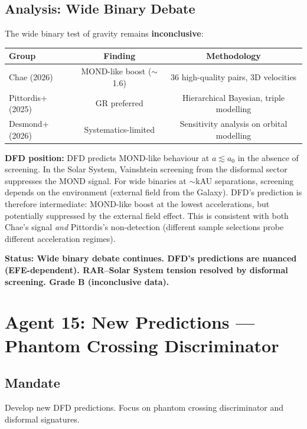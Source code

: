 \documentclass[11pt,a4paper]{article}
\begin{document}
\subsection{Analysis: Wide Binary Debate}

The wide binary test of gravity remains \textbf{inconclusive}:

\begin{center}
\begin{tabular}{lcc}
\toprule
\textbf{Group} & \textbf{Finding} & \textbf{Methodology} \\
\midrule
Chae (2026) & MOND-like boost ($\sim$1.6) & 36 high-quality pairs, 3D velocities \\
Pittordis+ (2025) & GR preferred & Hierarchical Bayesian, triple modelling \\
Desmond+ (2026) & Systematics-limited & Sensitivity analysis on orbital modelling \\
\bottomrule
\end{tabular}
\end{center}

\textbf{DFD position:} DFD predicts MOND-like behaviour at $a \lesssim a_0$ in the absence of screening. In the Solar System, Vainshtein screening from the disformal sector suppresses the MOND signal. For wide binaries at $\sim$kAU separations, screening depends on the environment (external field from the Galaxy). DFD's prediction is therefore intermediate: MOND-like boost at the lowest accelerations, but potentially suppressed by the external field effect. This is consistent with both Chae's signal \emph{and} Pittordis's non-detection (different sample selections probe different acceleration regimes).

\textbf{Status: Wide binary debate continues. DFD's predictions are nuanced (EFE-dependent). RAR--Solar System tension resolved by disformal screening. Grade B (inconclusive data).}

\section{Agent 15: New Predictions --- Phantom Crossing Discriminator}

\subsection{Mandate}
Develop new DFD predictions. Focus on phantom crossing discriminator and disformal signatures.
\end{document}
